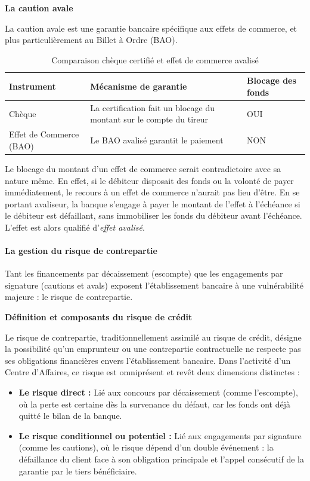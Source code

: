 \documentclass[12pt,a4paper]{report}
\begin{document}
\medskip\textbf{La caution avale}

La caution avale est une garantie bancaire spécifique aux effets de commerce, et plus particulièrement au Billet à Ordre (BAO).

\begin{table}[h!]
\centering
\begin{tabularx}{\textwidth}{X X X}
\toprule
Instrument & Mécanisme de garantie & Blocage des fonds \\
\midrule
Chèque & La certification fait un blocage du montant sur le compte du tireur & OUI \\
\addlinespace
Effet de Commerce (BAO) & Le BAO avalisé garantit le paiement & NON \\
\bottomrule
\end{tabularx}
\caption{Comparaison chèque certifié et effet de commerce avalisé}
\end{table}

Le blocage du montant d'un effet de commerce serait contradictoire avec sa nature même. En effet, si le débiteur disposait des fonds ou la volonté de payer immédiatement, le recours à un effet de commerce n'aurait pas lieu d'être. En se portant avaliseur, la banque s'engage à payer le montant de l'effet à l'échéance si le débiteur est défaillant, sans immobiliser les fonds du débiteur avant l'échéance. L'effet est alors qualifié d'\textit{effet avalisé}.

\paragraph{La gestion du risque de contrepartie}

Tant les financements par décaissement (escompte) que les engagements par signature (cautions et avals) exposent l'établissement bancaire à une vulnérabilité majeure : le risque de contrepartie.

\medskip\textbf{Définition et composants du risque de crédit}

Le risque de contrepartie, traditionnellement assimilé au risque de crédit, désigne la possibilité qu'un emprunteur ou une contrepartie contractuelle ne respecte pas ses obligations financières envers l'établissement bancaire. Dans l'activité d'un Centre d'Affaires, ce risque est omniprésent et revêt deux dimensions distinctes :

\begin{itemize}
  \item \textbf{Le risque direct :} Lié aux concours par décaissement (comme l'escompte), où la perte est certaine dès la survenance du défaut, car les fonds ont déjà quitté le bilan de la banque.
  \item \textbf{Le risque conditionnel ou potentiel :} Lié aux engagements par signature (comme les cautions), où le risque dépend d'un double événement : la défaillance du client face à son obligation principale et l'appel consécutif de la garantie par le tiers bénéficiaire.
\end{itemize}
\end{document}
